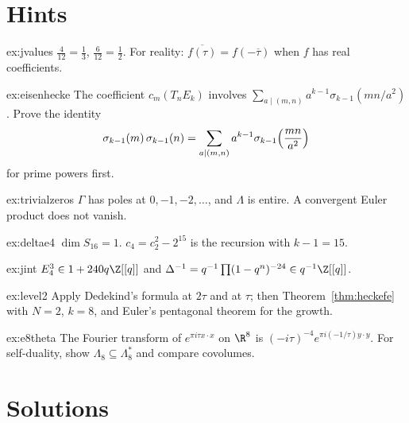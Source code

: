 \section{Hints}

\begin{hint}{ex:jvalues}
$\frac4{12}=\frac13$, $\frac6{12}=\frac12$. For reality: $\overline{f(\tau)}=f(-\overline\tau)$ when $f$ has real coefficients.
\end{hint}
\begin{hint}{ex:eisenhecke}
The coefficient $c_m(T_nE_k)$ involves $\sum_{a\mid(m,n)}a^{k-1}\sigma_{k-1}(mn/a^2)$. Prove the identity
\[
\sigma_{k-1}(m)\,\sigma_{k-1}(n)=\sum_{a\mid(m,n)}a^{k-1}\sigma_{k-1}\Bigl(\frac{mn}{a^2}\Bigr)
\]
for prime powers first.
\end{hint}
\begin{hint}{ex:trivialzeros}
$\Gamma$ has poles at $0,-1,-2,\dots$, and $\Lambda$ is entire. A convergent Euler product does not vanish.
\end{hint}
\begin{hint}{ex:deltae4}
$\dim S_{16}=1$. $c_4=c_2^2-2^{15}$ is the recursion with $k-1=15$.
\end{hint}
\begin{hint}{ex:jint}
$E_4^3\in1+240q\Z[[q]]$ and $\Delta^{-1}=q^{-1}\prod(1-q^n)^{-24}\in q^{-1}\Z[[q]]$.
\end{hint}
\begin{hint}{ex:level2}
Apply Dedekind's formula at $2\tau$ and at $\tau$; then Theorem~\ref{thm:heckefe} with $N=2$, $k=8$, and Euler's pentagonal theorem for the growth.
\end{hint}
\begin{hint}{ex:e8theta}
The Fourier transform of $e^{\pi i\tau x\cdot x}$ on $\R^8$ is $(-i\tau)^{-4}e^{\pi i(-1/\tau)y\cdot y}$. For self-duality, show $\Lambda_8\subseteq\Lambda_8^*$ and compare covolumes.
\end{hint}

\section{Solutions}

